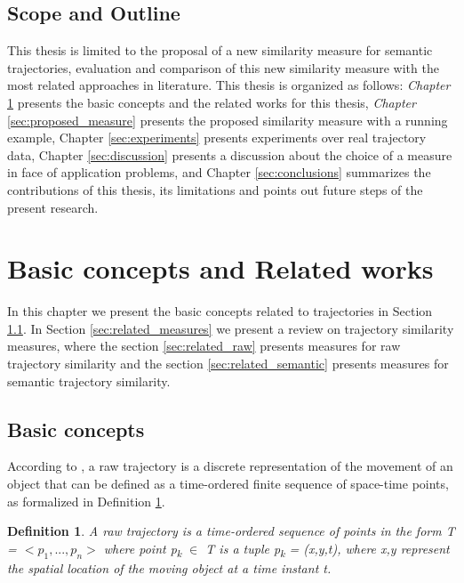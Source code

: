 \documentclass[12pt]{article}
\newtheorem{definition}{Definition}
\begin{document}
\subsection{Scope and Outline}

This thesis is limited to the proposal of a new similarity measure for semantic trajectories, evaluation and comparison of this new similarity measure with the most related approaches in literature. This thesis is organized as follows: \textit{Chapter} \ref{sec:related} presents the basic concepts and the related works for this thesis, \textit{Chapter} \ref{sec:proposed_measure} presents the proposed similarity measure with a running example, Chapter \ref{sec:experiments} presents experiments over real trajectory data, Chapter \ref{sec:discussion} presents a discussion about the choice of a measure in face of application problems, and Chapter \ref{sec:conclusions} summarizes the contributions of this thesis, its limitations and points out future steps of the present research.

\section{Basic concepts and Related works} \label{sec:related}
In this chapter we present the basic concepts related to trajectories in Section \ref{sec:basic_concepts}. In Section \ref{sec:related_measures} we present a review on trajectory similarity measures, where the section \ref{sec:related_raw} presents measures for raw trajectory similarity and the section \ref{sec:related_semantic} presents measures for semantic trajectory similarity.

\subsection{Basic concepts} \label{sec:basic_concepts}
According to \cite{parent2013semantic}, a raw trajectory is a discrete representation of the movement of an object that can be defined as a time-ordered finite sequence of space-time points, as formalized in Definition \ref{def:raw_trajectory}. 

\begin{definition} \label{def:raw_trajectory} A raw trajectory is a time-ordered sequence of points in the form T = $<p_1,...,p_n>$ where point p\textsubscript{k} $\in$ T is a tuple p\textsubscript{k} = (x,y,t), where x,y represent the spatial location of the moving object at a time instant t.
\end{definition}
\end{document}
